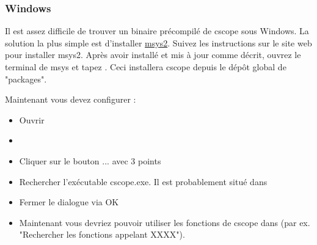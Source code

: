 \subsubsection{Windows}

Il est assez difficile de trouver un binaire précompilé de cscope sous Windows. La solution la plus simple est d'installer \href{https://www.msys2.org/}{msys2}. Suivez les instructions sur le site web \cite{url:msys2} pour installer msys2. Après avoir installé et mis à jour comme décrit, ouvrez le terminal de msys et tapez . Ceci installera cscope depuis le dépôt global de "packages".

Maintenant vous devez configurer \codeblocks:

\begin{itemize}[noitemsep]
\item Ouvrir \codeblocks
\item {}
\item Cliquer sur le bouton ... avec 3 points
\item Rechercher l'exécutable cscope.exe. Il est probablement situé dans \newline
\item Fermer le dialogue via OK
\item Maintenant vous devriez pouvoir utiliser les fonctions de cscope dans \codeblocks (par ex. "Rechercher les fonctions appelant XXXX").
\end{itemize} 
